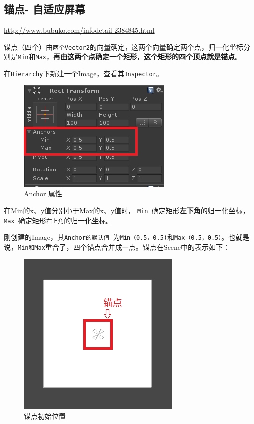 \documentclass[UTF8,a4paper,12pt]{ctexbook}
\begin{document}
		\subsection{锚点- 自适应屏幕}
			\url{http://www.bubuko.com/infodetail-2384845.html}
			
			
			锚点（四个）由\verb|两个Vector2|的向量确定，这两个向量确定两个点，归一化坐标分别是\verb|Min|和\verb|Max|，\textbf{再由这两个点确定一个矩形}，\textbf{这个矩形的四个顶点就是锚点}。
			
			在\verb|Hierarchy|下新建一个Image，查看其\verb|Inspector|。
			
			\begin{figure}[H]
				\centering
				\includegraphics[scale=1.2]{Anchor.png}
				\caption{Anchor 属性}
			\end{figure}
			
			在Min的x、y值分别小于Max的x、y值时，
			\verb|Min |确定矩形\textbf{左下角}的归一化坐标，\verb|Max |确定矩形\verb|右上角|的归一化坐标。
			
			刚创建的Image，其\verb|Anchor的默认值 |为\verb|Min（0.5，0.5)|和\verb|Max（0.5，0.5）|。也就是说，\verb|Min和Max|重合了，四个锚点合并成一点。锚点在Scene中的表示如下：
			
			\begin{figure}[H]
				\centering
				\includegraphics[scale=0.7]{anchorFirst.png}
				\caption{锚点初始位置}
			\end{figure}
		
\end{document}
